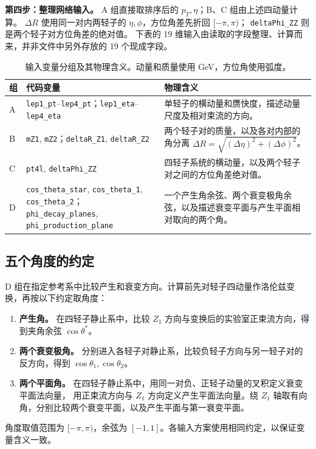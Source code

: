 \documentclass[11pt,a4paper,fontset=fandol,scheme=plain]{ctexart}
\begin{document}
\textbf{第四步：整理网络输入。} A 组直接取排序后的 $p_T,\eta$；B、C 组由上述四动量计算。
$\Delta R$ 使用同一对内两轻子的 $\eta,\phi$，方位角差先折回 $[-\pi,\pi)$；
\texttt{deltaPhi\_ZZ} 则是两个轻子对方位角差的绝对值。
下表的 19 维输入由读取的字段整理、计算而来，并非文件中另外存放的 19 个现成字段。
\begin{table}[H]
\caption{输入变量分组及其物理含义。动量和质量使用 GeV，方位角使用弧度。}
\label{tab:features}
\small
\renewcommand{\arraystretch}{1.12}
\begin{tabularx}{\linewidth}{@{}p{.05\linewidth}p{.43\linewidth}Y@{}}
\toprule
组 & 代码变量 & 物理含义 \\
\midrule
A & \texttt{lep1\_pt}--\texttt{lep4\_pt}；\texttt{lep1\_eta}--\texttt{lep4\_eta} &
单轻子的横动量和赝快度，描述动量尺度及相对束流的方向。 \\
B & \texttt{mZ1}, \texttt{mZ2}；\texttt{deltaR\_Z1}, \texttt{deltaR\_Z2} &
两个轻子对的质量，以及各对内部的角分离 $\Delta R=\sqrt{(\Delta\eta)^2+(\Delta\phi)^2}$。 \\
C & \texttt{pt4l}, \texttt{deltaPhi\_ZZ} &
四轻子系统的横动量，以及两个轻子对之间的方位角差绝对值。 \\
D & \texttt{cos\_theta\_star}, \texttt{cos\_theta\_1}, \texttt{cos\_theta\_2}；
\texttt{phi\_decay\_planes}, \texttt{phi\_production\_plane} &
一个产生角余弦、两个衰变极角余弦，以及描述衰变平面与产生平面相对取向的两个角。 \\
\bottomrule
\end{tabularx}
\end{table}
\subsection{五个角度的约定}
D 组在指定参考系中比较产生和衰变方向。计算前先对轻子四动量作洛伦兹变换，再按以下约定取角度：
\begin{enumerate}[leftmargin=1.7em,itemsep=3pt]
\item \textbf{产生角。} 在四轻子静止系中，比较 $Z_1$ 方向与变换后的实验室正束流方向，得到夹角余弦 $\cos\theta^*$。
\item \textbf{两个衰变极角。} 分别进入各轻子对静止系，比较负轻子方向与另一轻子对的反方向，得到 $\cos\theta_1,\cos\theta_2$。
\item \textbf{两个平面角。} 在四轻子静止系中，用同一对负、正轻子动量的叉积定义衰变平面法向量，
用正束流方向与 $Z_1$ 方向定义产生平面法向量。绕 $Z_1$ 轴取有向角，分别比较两个衰变平面，以及产生平面与第一衰变平面。
\end{enumerate}
角度取值范围为 $[-\pi,\pi)$，余弦为 $[-1,1]$。各输入方案使用相同约定，以保证变量含义一致。
\FloatBarrier
\end{document}
